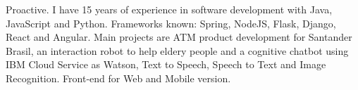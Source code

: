 

\begin{cvparagraph}

Proactive. I have 15 years of experience in software development with Java, JavaScript and Python. Frameworks known: Spring, NodeJS, Flask, Django, React and Angular. Main projects are ATM product development for Santander Brasil, an interaction robot to help eldery people and a cognitive chatbot using IBM Cloud Service as Watson, Text to Speech, Speech to Text and Image Recognition. Front-end for Web and Mobile version.
\end{cvparagraph}
